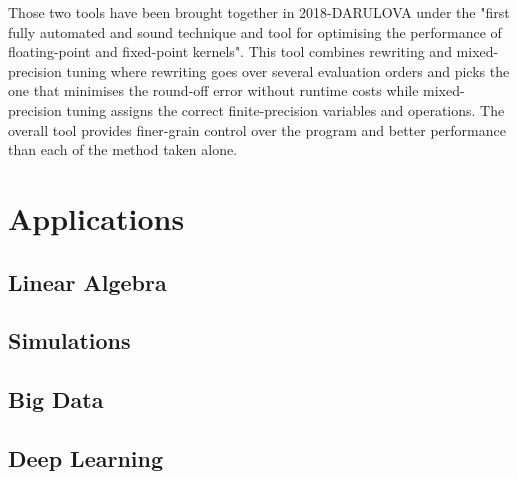 Those two tools have been brought together in 2018-DARULOVA under the "first fully automated and sound technique and tool for optimising the performance of floating-point and fixed-point kernels". This tool combines rewriting and mixed-precision tuning where rewriting goes over several evaluation orders and picks the one that minimises the round-off error without runtime costs while mixed-precision tuning assigns the correct finite-precision variables and operations. The overall tool provides finer-grain control over the program and better performance than each of the method taken alone.


\section{Applications}


\subsection{Linear Algebra}


\subsection{Simulations}


\subsection{Big Data}


\subsection{Deep Learning}

